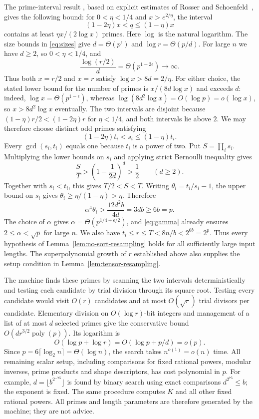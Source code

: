 \documentclass[11pt]{article}
\theoremstyle{definition}
\begin{document}
The prime-interval result
\cite[Lemma~5.1]{HarveyHoeven2021}, based on explicit estimates of
Rosser and Schoenfeld~\cite{RosserSchoenfeld1962}, gives the following
bound: for
$0<\eta<1/4$ and $x>e^{2/\eta}$, the interval
\[
 (1-2\eta)x<q\leq(1-\eta)x
\]
contains at least $\eta x/(2\log x)$ primes. Here $\log$ is the natural
logarithm. The size bounds in \eqref{eq:sizes} give
$d=\Theta(p^\epsilon)$ and $\log r=\Theta(p/d)$.
For large $n$ we have $d\geq2$, so
$0<\eta<1/4$, and
\[
 \frac{\log(r/2)}d=\Theta(p^{1-2\epsilon})\longrightarrow\infty.
\]
Thus both $x=r/2$ and $x=r$ satisfy $\log x>8d=2/\eta$.
For either choice, the stated lower bound for the number of primes is
$x/(8d\log x)$ and exceeds $d$:
indeed, $\log x=\Theta(p^{1-\epsilon})$, whereas
$\log(8d^2\log x)=O(\log p)=o(\log x)$, so $x>8d^2\log x$ eventually.
The two intervals are disjoint because
$(1-\eta)r/2<(1-2\eta)r$ for $\eta<1/4$, and both intervals lie above
$2$. We may therefore choose distinct odd primes satisfying
\[
 (1-2\eta)t_i<s_i\leq(1-\eta)t_i.
\]
Every $\gcd(s_i,t_i)$ equals one because $t_i$ is a power of two.
Put $S=\prod_i s_i$. Multiplying the lower bounds on $s_i$ and
applying strict Bernoulli inequality gives
\[
 \frac ST>
 \left(1-\frac1{2d}\right)^d>\frac12
 \qquad(d\geq2).
\]
Together with $s_i<t_i$, this gives $T/2<S<T$.
Writing $\theta_i=t_i/s_i-1$, the upper bound on $s_i$ gives
$\theta_i\geq\eta/(1-\eta)>\eta$. Therefore
\[
 \alpha^4\theta_i>\frac{12d^2b}{4d}=3db\geq6b=p.
\]
The choice of $\alpha$ gives
$\alpha=\Theta(p^{1/4+\epsilon/2})$, and \eqref{eq:gamma} already
ensures $2\leq\alpha<\sqrt p$ for large $n$. We also have
$t_i\leq r\leq T<8n/b<2^{6b}=2^p$.
Thus every hypothesis of Lemma~\ref{lem:no-sort-resampling} holds for
all sufficiently large input lengths. The superpolynomial growth of $r$
established above also supplies the setup condition in
Lemma~\ref{lem:tensor-resampling}.

The machine finds these primes by scanning the two intervals
deterministically and testing each candidate by trial division through
its square root. Testing every candidate would visit $O(r)$ candidates
and at most $O(\sqrt r)$ trial divisors per candidate. Elementary
division on $O(\log r)$-bit integers and management of a list of at most
$d$ selected primes give the conservative bound
$O(dr^{3/2}\operatorname{poly}(p))$. Its logarithm is
\[
 O(\log p+\log r)=O(\log p+p/d)=o(p).
\]
Since $p=6\lceil\log_2 n\rceil=\Theta(\log n)$, the search takes
$n^{o(1)}=o(n)$ time.
All remaining scalar setup, including comparisons for fixed rational
powers, modular inverses,
prime products and shape descriptors, has cost polynomial in $p$.
For example, $d=\lfloor b^{2^{-75}}\rfloor$ is found by binary search
using exact comparisons $d^{2^{75}}\le b$; the exponent is fixed.
The same procedure computes $K$ and all other fixed rational powers.
All primes and length parameters are therefore generated by the machine;
they are not advice.
\end{document}
